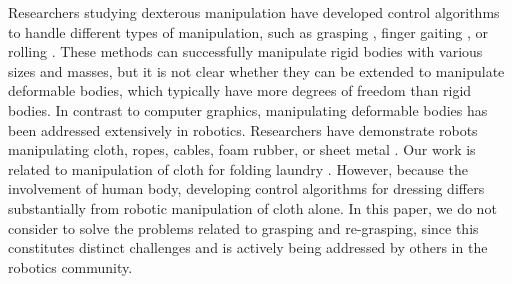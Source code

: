 


Researchers studying dexterous manipulation have developed control algorithms to handle different types of manipulation, such as grasping \cite{Pollard:2005:PBG,Kry:2006:ICS,Wang:2013:VHM,Zhao:2013:RRP}, finger gaiting \cite{Ye:2012:SDH}, or rolling \cite{Bai:2014:DMU}. These methods can successfully manipulate rigid bodies with various sizes and masses, but it is not clear whether they can be extended to manipulate deformable bodies, which typically have more degrees of freedom than rigid bodies. In contrast to computer graphics, manipulating deformable bodies has been addressed extensively in robotics. Researchers have demonstrate robots manipulating cloth, ropes, cables, foam rubber, or sheet metal \cite{Kosuge:1995:MFO,Wu:1995:AHC,Fahantidis:1997:RHF,Osawa:2007:UML,Cusumano:2011:BCD,Bersch:2011:BRC,Miller:2012:GAR}. Our work is related to manipulation of cloth for folding laundry \cite{Osawa:2007:UML,Cusumano:2011:BCD,Bersch:2011:BRC,Miller:2012:GAR}. However, because the involvement of human body, developing control algorithms for dressing differs substantially from robotic manipulation of cloth alone. In this paper, we do not consider to solve the problems related to grasping and re-grasping, since this constitutes distinct challenges and is actively being addressed by others in the robotics community.



